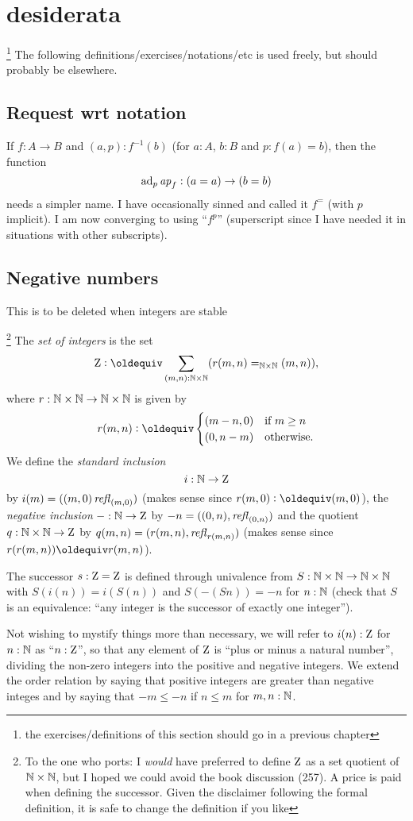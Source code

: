 {\color{blue}\small\section{desiderata}\footnote{the exercises/definitions of this section should go in a previous chapter}
The following definitions/exercises/notations/etc is used freely, but should probably be elsewhere.

\subsection{Request wrt notation}
\label{sec:requestnotation}

If $f:A\to B$ and $(a,p):f^{-1}(b)$ (for $a:A$, $b:B$ and $p:f(a)=b$), then the function
$$\mathrm{ad}_p\mathop{{\it ap}_{f}}:(a=a)\to(b=b)$$
needs a simpler name.  
I have occasionally sinned and called it $f^=$ (with $p$ implicit).  
I am now converging to using ``$f^p$'' (superscript since I have needed it in situations with other subscripts).


\subsection{Negative numbers}
This is to be deleted when integers are stable


\begin{definition}
\footnote{To the one who ports: I \emph{would} have preferred to define $\mathrm{Z}$ as a set quotient of $\mathbb{N}\times\mathbb{N}$, but I hoped we could avoid the book discussion (257).  A price is paid when defining the successor.  Given the disclaimer following the formal definition, it is safe to change the definition if you like}
  The \emph{set of integers} is the set
$$\zet\defequi \sum_{(m,n):\NN\times\NN}(r(m,n)=_{\NN\times\NN}(m,n)),$$
where $r:\mathbb{N}\times\mathbb{N}\to\mathbb{N}\times\mathbb{N}$ is given by
$$r(m,n)\defequi
\begin{cases}
  (m-n,0)&\text{if $m\geq n$}\\
  (0,n-m)&\text{otherwise.}
\end{cases}
$$
We define the \emph{standard inclusion} 
$$i:\mathbb{N}\to\mathrm{Z}$$ by $i(m)=((m,0)\mathop{{\it refl}_{(m,0)}})$ (makes sense since $r(m,0)\defequi(m,0)$), the \emph{negative inclusion} $-:\mathbb{N}\to\mathrm{Z}$ by $-n=((0,n),\mathop{{\it refl}_{(0,n)}})$ and the quotient $q:\mathbb{N}\times\mathbb{N}\to\mathrm{Z}$ by $q(m,n)=(r(m,n),\mathop{{\it refl}_{r(m,n)}})$ (makes sense since $r(r(m,n))\oldequiv r(m,n)$).  

The successor $s:\mathrm{Z}=\mathrm{Z}$ is defined through univalence from $S : \mathbb{N}\times\mathbb{N}\to\mathbb{N}\times\mathbb{N}$ with $S(i(n))=i(S(n))$  and $S(-(Sn))=-n$ for $n:\mathbb{N}$ (check that $S$ is an equivalence: ``any integer is the successor of exactly one integer'').
\end{definition}

Not wishing to mystify things more than necessary, we will refer to $i(n):\mathrm{Z}$ for $n:\mathbb{N}$ as ``$n:\mathrm{Z}$'', so that any element of $\mathrm{Z}$ is ``plus or minus a natural number'', dividing the non-zero integers into the positive and negative integers.  We extend the order relation by saying that positive integers are greater than negative integes and by saying that $-m\leq -n$ if $n\leq m$ for $m,n:\mathbb{N}$.
}%

